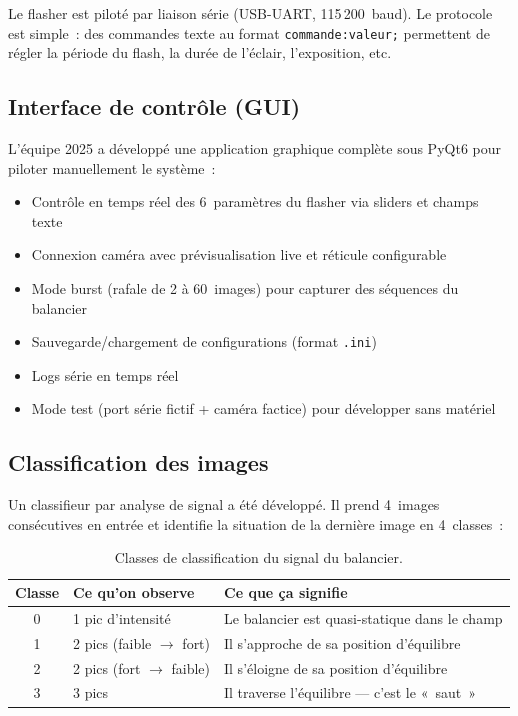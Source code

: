 \documentclass[a4paper,11pt]{article}
\newcommand{\code}[1]{\colorbox{codebg}{\texttt{#1}}}
\begin{document}
Le flasher est piloté par liaison série (USB-UART, 115\,200~baud). Le protocole est simple~: des commandes texte au format \code{commande:valeur;} permettent de régler la période du flash, la durée de l'éclair, l'exposition, etc.

\subsection{Interface de contrôle (GUI)}

L'équipe 2025 a développé une application graphique complète sous PyQt6 pour piloter manuellement le système~:

\begin{itemize}
    \item Contrôle en temps réel des 6~paramètres du flasher via sliders et champs texte
    \item Connexion caméra avec prévisualisation live et réticule configurable
    \item Mode burst (rafale de 2 à 60~images) pour capturer des séquences du balancier
    \item Sauvegarde/chargement de configurations (format \code{.ini})
    \item Logs série en temps réel
    \item Mode test (port série fictif + caméra factice) pour développer sans matériel
\end{itemize}

\subsection{Classification des images}

Un classifieur par analyse de signal a été développé. Il prend 4~images consécutives en entrée et identifie la situation de la dernière image en 4~classes~:

\begin{table}[h]
    \centering
    \begin{tabular}{c l l}
        \toprule
        \textbf{Classe} & \textbf{Ce qu'on observe} & \textbf{Ce que ça signifie} \\
        \midrule
        0 & 1 pic d'intensité & Le balancier est quasi-statique dans le champ \\
        1 & 2 pics (faible $\to$ fort) & Il s'approche de sa position d'équilibre \\
        2 & 2 pics (fort $\to$ faible) & Il s'éloigne de sa position d'équilibre \\
        3 & 3 pics & Il traverse l'équilibre --- c'est le «~saut~» \\
        \bottomrule
    \end{tabular}
    \caption{Classes de classification du signal du balancier.}
    \label{tab:classes}
\end{table}
\end{document}

